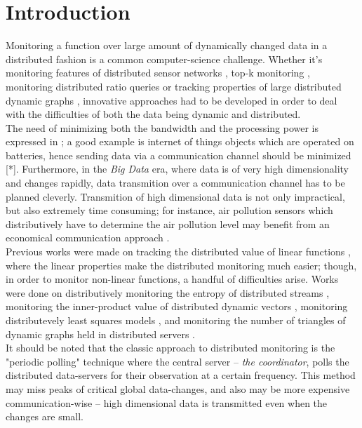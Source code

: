 \documentclass[10pt, conference]{IEEEtran}
\newcommand{\theCoordinator}{\textit{the coordinator}}
\begin{document}
\section{Introduction}
Monitoring a function over large amount of dynamically changed data in a distributed fashion is a common computer-science challenge. Whether it's monitoring features of distributed sensor networks \cite{burdakis2012detecting}, top-k monitoring \cite{babcock2003distributed}, monitoring distributed ratio queries \cite{gupta2013ratio} or tracking properties of large distributed dynamic graphs \cite{mcgregor2015densest}, innovative approaches had to be developed in order to deal with the difficulties of both the data being dynamic and distributed. \\
The need of minimizing both the bandwidth and the processing power is expressed in \cite{giatrakos2013network}; a good example is internet of things objects which are operated on batteries, hence sending data via a communication channel should be minimized [*]. Furthermore, in the \textit{Big Data} era, where data is of very high dimensionality and changes rapidly, data transmition over a communication channel has to be planned cleverly. Transmition of high dimensional data is not only impractical, but also extremely time consuming; for instance, air pollution sensors which distributively have to determine the air pollution level may benefit from an economical communication approach \cite{cheng2004revised}. \\
Previous works were made on tracking the distributed value of linear functions \cite{keralapura2006communication}, where the linear properties make the distributed monitoring much easier; though, in order to monitor non-linear functions, a handful of difficulties arise. Works were done on distributively monitoring the entropy of distributed streams \cite{gabel2017anarchists}\cite{cormode2013continuous}, monitoring the inner-product value of distributed dynamic vectors \cite{garofalakis2013sketch}, monitoring distributevely least squares models \cite{gabel2015monitoring}, and monitoring the number of triangles of dynamic graphs held in distributed servers \cite{yehuda2017monitoring}. \\
It should be noted that the classic approach to distributed monitoring is the "periodic polling" technique \cite{cormode2013continuous} where the central server -- \theCoordinator , polls the distributed data-servers for their observation at a certain frequency. This method may miss peaks of critical global data-changes, and also may be more expensive communication-wise -- high dimensional data is transmitted even when the changes are small. \\
\end{document}
